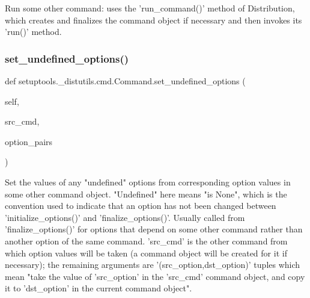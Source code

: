 \begin{DoxyVerb}Run some other command: uses the 'run_command()' method of
Distribution, which creates and finalizes the command object if
necessary and then invokes its 'run()' method.
\end{DoxyVerb}
 \mbox{\label{classsetuptools_1_1__distutils_1_1cmd_1_1Command_a43ecf80070150ef61f8b991c7e35a580}} 
\subsubsection{\texorpdfstring{set\+\_\+undefined\+\_\+options()}{set\_undefined\_options()}}
{\footnotesize\ttfamily def setuptools.\+\_\+distutils.\+cmd.\+Command.\+set\+\_\+undefined\+\_\+options (\begin{DoxyParamCaption}\item[{}]{self,  }\item[{}]{src\+\_\+cmd,  }\item[{}]{option\+\_\+pairs }\end{DoxyParamCaption})}

\begin{DoxyVerb}Set the values of any "undefined" options from corresponding
option values in some other command object.  "Undefined" here means
"is None", which is the convention used to indicate that an option
has not been changed between 'initialize_options()' and
'finalize_options()'.  Usually called from 'finalize_options()' for
options that depend on some other command rather than another
option of the same command.  'src_cmd' is the other command from
which option values will be taken (a command object will be created
for it if necessary); the remaining arguments are
'(src_option,dst_option)' tuples which mean "take the value of
'src_option' in the 'src_cmd' command object, and copy it to
'dst_option' in the current command object".
\end{DoxyVerb}
 \mbox{\label{classsetuptools_1_1__distutils_1_1cmd_1_1Command_a65764cb2914106df8dd542a0c51f2539}} 
